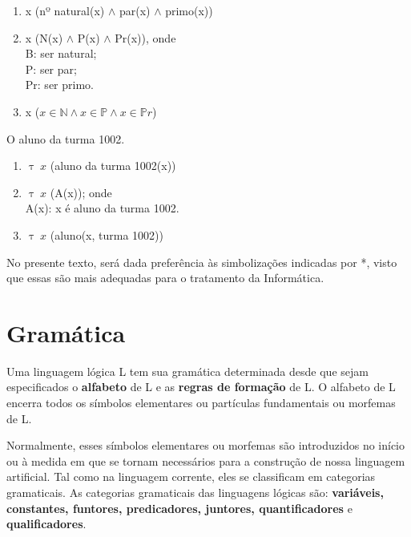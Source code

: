 \begin{enumerate}[label=(\roman*)]
    \item x (nº natural(x) $\land$ par(x) $\land$ primo(x))
    \item x (N(x) $\land$ P(x) $\land$ Pr(x)), onde\\
    B: ser natural;\\
    P: ser par;\\
    Pr: ser primo.
    \item x ($x \in \mathbb{N} \land x \in \mathbb{P} \land x \in \mathbb{P} r$)
\end{enumerate}

\bigskip

\begin{exemplo} O aluno da turma 1002.
\end{exemplo}

\begin{enumerate}[label=(\roman*)]
    \item $\uptau\ x$ (aluno da turma 1002(x))
    \item $\uptau\ x$ (A(x)); onde\\
    A(x): x é aluno da turma 1002.
    \item $\uptau\ x$ (aluno(x, turma 1002))
\end{enumerate}

No presente texto, será dada preferência às simbolizações indicadas por *, visto que essas são mais adequadas para o tratamento da Informática.

\newpage

\section{Gramática}
\setcounter{exemplo}{0}

Uma linguagem lógica L tem sua gramática determinada desde que sejam especificados o \textbf{alfabeto} de L e as \textbf{regras de formação} de L.
O alfabeto de L encerra todos os símbolos elementares ou partículas fundamentais ou morfemas de L.

Normalmente, esses símbolos elementares ou morfemas são introduzidos no início ou à medida em que se tornam necessários para a construção de nossa linguagem artificial.
Tal como na linguagem corrente, eles se classificam em categorias gramaticais.
As categorias gramaticais das linguagens lógicas são: \textbf{variáveis, constantes, funtores, predicadores, juntores, quantificadores} e \textbf{qualificadores}.


